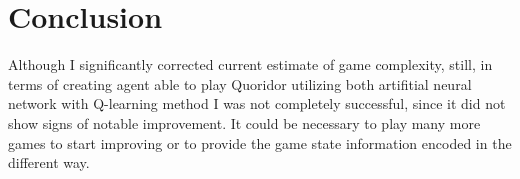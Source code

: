\chapter{Conclusion}\label{chap:6}

Although I significantly corrected current estimate of game complexity, still,
in terms of creating agent able to play Quoridor utilizing
both artifitial neural network with Q-learning method I was not completely
successful, since it did not show signs of notable improvement.
It could be necessary to play many more games to start improving or to provide
the game state information encoded in the different way.
